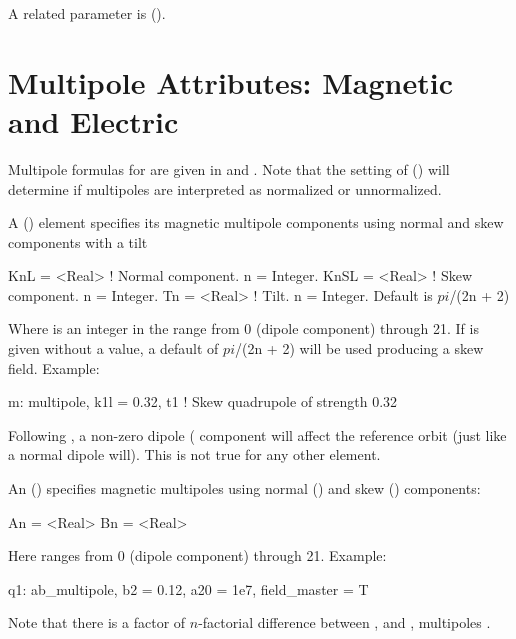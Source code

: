 A related parameter is  ().

\section{Multipole Attributes: Magnetic and Electric}
\label{s:multip}

Multipole formulas for are given in  and . Note that the
setting of  () will determine if multipoles are interpreted as
normalized or unnormalized.

A  () element specifies its magnetic multipole components using normal
and skew components with a tilt
\begin{example}
  KnL  = <Real>  ! Normal component. n = Integer. 
  KnSL = <Real>  ! Skew component. n = Integer. 
  Tn   = <Real>  ! Tilt. n = Integer. Default is $pi$/(2n + 2)
\end{example}
Where  is an integer in the range from 0 (dipole component) through 21.  If  is given
without a value, a default of $pi$/(2n + 2) will be used producing a skew field. Example:
\begin{example}
  m: multipole, k1l = 0.32, t1  ! Skew quadrupole of strength 0.32
\end{example}
Following , a non-zero dipole ( component will affect the reference orbit (just like
a normal dipole will). This is not true for any other element.

An  () specifies magnetic multipoles
using normal () and skew () components:
\begin{example}
  An = <Real>
  Bn = <Real>
\end{example}
Here  ranges from 0 (dipole component) through 21. Example:
\begin{example}
  q1: ab_multipole, b2 = 0.12, a20 = 1e7, field_master = T
\end{example}
Note that there is a factor of $n$-factorial difference between ,  and ,
 multipoles .

